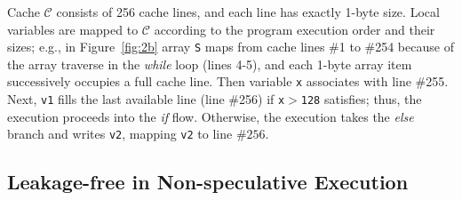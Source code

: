 \documentclass[sigconf]{acmart}
\begin{document}
Cache $\mathcal{C}$ consists of 256 cache lines, and each line has exactly 
1-byte size. Local variables are mapped to $\mathcal{C}$ according to the 
program execution order and their sizes; e.g., in Figure~\ref{fig:2b} array 
\texttt{S} maps from cache lines \#1 to \#254 because of the array traverse 
in the \emph{while} loop (lines 4-5), and each 1-byte array item successively 
occupies a full cache line. Then variable \texttt{x} associates with line 
\#255. Next, \texttt{v1} fills the last available line (line \#256) if 
\texttt{x}$>$\texttt{128} satisfies; thus, the execution proceeds into the 
\textit{if} flow. Otherwise, the execution takes the \textit{else} branch 
and writes \texttt{v2}, mapping \texttt{v2} to line $\#256$.






\subsection{Leakage-free in Non-speculative Execution}
\label{sec:no_leak}
\end{document}
